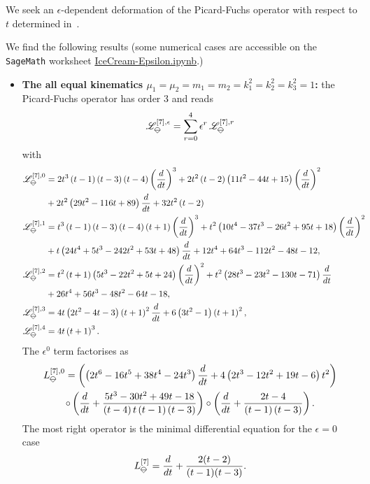 \documentclass[a4paper,12pt]{article}
\numberwithin{equation}{section}
\numberwithin{figure}{section}
\newcommand{\IceCream}{	\begin{tikzpicture}[scale=0.05]
	\draw[color = black, fill=none] (2,0) arc(0:180:2);
		\draw [black] (-2,0) to (2,0);
		\draw [black] (-2,0) to (0,-2);
                	\draw [black] (2,0) to (0,-2);
	\end{tikzpicture}}
\begin{document}
We seek an $\epsilon$-dependent deformation of the Picard-Fuchs
operator with respect to $t$ determined in~\cite{Lairez:2022zkj,Doran:2023yzu}.

We find the following results (some numerical cases are accessible on
the {\tt
  SageMath} worksheet \href{IceCream-Epsilon.ipynb}{IceCream-Epsilon.ipynb}.)
\begin{itemize}
	\item {\bf The all equal kinematics
		$\mu_1=\mu_2=m_1=m_2=k_1^2=k_2^2=k_3^2=1$:} the Picard-Fuchs operator
	has order 3 and
	reads
	\begin{equation}
		\mathscr{L}_{\IceCream}^{[7],\epsilon}=\sum_{r=0}^4 \epsilon^r\,\mathscr{L}_{\IceCream}^{[7],r}
	\end{equation}
	with
	\begin{align}
		\mathscr{L}_{\IceCream}^{[7],0}&= 2 t^{3} \left(t -1\right)
		\left(t -3\right) \left(t -4\right) \left(d\over dt\right)^{3}+2 t^{2} \left(t
		-2\right) \left(11 t^{2}-44 t +15\right) \left(d\over dt\right)^{2}\cr&+2 t^{2}
		\left(29 t^{2}-116 t +89\right) {d\over dt} +32 t^{2} \left(t
		-2\right)\cr
		\mathscr{L}_{\IceCream}^{[7],1}&=t^{3} \left(t -1\right) \left(t -3\right) \left(t -4\right) \left(t +1\right) \left(d\over dt\right)^{3}+t^{2} \left(10 t^{4}-37 t^{3}-26 t^{2}+95 t +18\right) \left(d\over dt\right)^{2}\cr&+t \left(24 t^{4}+5 t^{3}-242 t^{2}+53 t +48\right)  {d\over dt} +12 t^{4}+64 t^{3}-112 t^{2}-48 t -12,\cr
		\mathscr{L}_{\IceCream}^{[7],2}&=t^{2} \left(t +1\right) \left(5 t^{3}-22 t^{2}+5 t +24\right) \left(d\over dt\right)^{2}+t^{2} \left(28 t^{3}-23 t^{2}-130 t -71\right)  {d\over dt} \cr&+26 t^{4}+56 t^{3}-48 t^{2}-64 t -18,\cr
		\mathscr{L}_{\IceCream}^{[7],3}&=4 t \left(2 t^{2}-4 t -3\right) \left(t +1\right)^{2}
		{d\over dt}+6 \left(3 t^{2}-1\right) \left(t +1\right)^{2},\cr
		\mathscr{L}_{\IceCream}^{[7],4}&= 4 t \left(t +1\right)^{3}.
	\end{align}
	The $\epsilon^0$ term factorises as
	\begin{multline}
		L_{\IceCream}^{[7],0}=\left(
		\left(2 t^{6}-16 t^{5}+38 t^{4}-24 t^{3}\right) {{d\over dt}} +4 \left(2 t^{3}-12 t^{2}+19 t -6\right) t^{2}\right)\cr\circ
		\left(
		{{d\over dt}} +\frac{5 t^{3}-30 t^{2}+49 t -18}{\left(t -4\right) t \left(t -1\right) \left(t -3\right)}
		\right)\circ \left({{d\over dt}} +\frac{2 t -4}{\left(t -1\right) \left(t -3\right)}
		\right).
	\end{multline}
	The most right operator is the minimal differential equation for the
	$\epsilon=0$ case~\cite{Lairez:2022zkj}
	\begin{equation}
		L_{\IceCream}^{[7]}= {d\over dt}+ {2(t - 2)\over (t - 1)(t - 3)  }.
	\end{equation}
	

\end{itemize}
\end{document}
